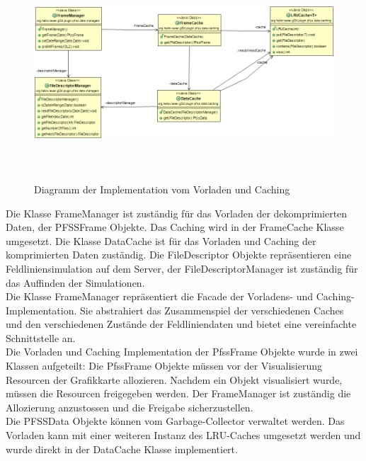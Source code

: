 \begin{figure}[!htbp]
	\center
	\includegraphics[width=1\textwidth,height=8cm,keepaspectratio]{./pictures/implementation/architectureCache.png}
	\caption{Diagramm der Implementation vom Vorladen und Caching}
	\label{implementation:architektur:caching}
\end{figure}
Die Klasse FrameManager ist zuständig für das Vorladen der dekomprimierten Daten, der PFSSFrame Objekte. Das Caching wird in der FrameCache Klasse umgesetzt. Die Klasse DataCache ist für das Vorladen und Caching der komprimierten Daten zuständig. Die FileDescriptor Objekte repräsentieren eine Feldliniensimulation auf dem Server, der FileDescriptorManager ist zuständig für das Auffinden der Simulationen.\\
Die Klasse FrameManager repräsentiert die Facade der Vorladens- und Caching- Implementation. Sie abstrahiert das Zusammenspiel der verschiedenen Caches und den verschiedenen Zustände der Feldliniendaten und bietet eine vereinfachte Schnittstelle an.\\
Die Vorladen und Caching Implementation der PfssFrame Objekte wurde in zwei Klassen aufgeteilt: Die PfssFrame Objekte müssen vor der Visualisierung Resourcen der Grafikkarte allozieren. Nachdem ein Objekt visualisiert wurde, müssen die Resourcen freigegeben werden. Der FrameManager ist zuständig die Allozierung anzustossen und die Freigabe sicherzustellen.\\
Die PFSSData Objekte können vom Garbage-Collector verwaltet werden. Das Vorladen kann mit einer weiteren Instanz des LRU-Caches umgesetzt werden und wurde direkt in der DataCache Klasse implementiert.


